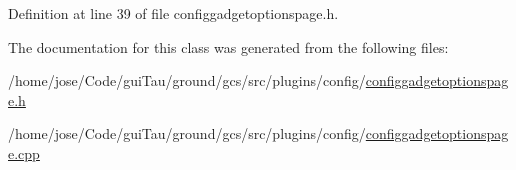 Definition at line 39 of file configgadgetoptionspage.\-h.



The documentation for this class was generated from the following files\-:\begin{DoxyCompactItemize}
\item 
/home/jose/\-Code/gui\-Tau/ground/gcs/src/plugins/config/\hyperlink{configgadgetoptionspage_8h}{configgadgetoptionspage.\-h}\item 
/home/jose/\-Code/gui\-Tau/ground/gcs/src/plugins/config/\hyperlink{configgadgetoptionspage_8cpp}{configgadgetoptionspage.\-cpp}\end{DoxyCompactItemize}
